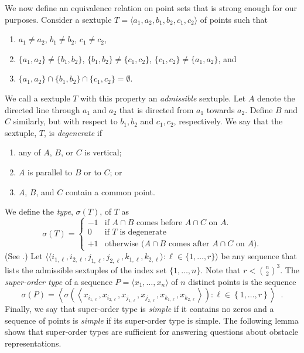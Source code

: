 \documentclass{patmorin}
\begin{document}
We now define an equivalence relation on point sets that is
strong enough for our purposes.  Consider a sextuple $T=\langle
a_1,a_2,b_1,b_2,c_1,c_2\rangle$ of points such that
\begin{enumerate}
  \item  $a_1\neq a_2$, $b_1\neq b_2$, $c_1\neq c_2$, 
  \item  $\{a_1,a_2\}\neq \{b_1,b_2\}$, 
$\{b_1,b_2\}\neq \{c_1,c_2\}$, $\{c_1,c_2\}\neq \{a_1,a_2\}$, and 
  \item $\{a_1,a_2\}\cap\{b_1,b_2\}\cap\{c_1,c_2\}=\emptyset$.
\end{enumerate}
We call a sextuple $T$ with this property an \emph{admissible} sextuple.
Let $A$ denote the directed line through $a_1$ and $a_2$ that is directed
from $a_1$ towards $a_2$. Define $B$ and $C$ similarly, but with respect
to $b_1,b_2$ and $c_1,c_2$, respectively.  We say that the sextuple,
$T$, is \emph{degenerate} if
\begin{enumerate}
  \item any of $A$, $B$, or $C$ is vertical;
  \item $A$ is parallel to $B$ or to $C$; or
  \item $A$, $B$, and $C$ contain a common point.
\end{enumerate}
We define the \emph{type}, $\sigma(T)$, of $T$ as
\[
    \sigma(T) = \left\{\begin{array}{rl}
      -1 & \text{if $A\cap B$ comes before $A\cap C$ on $A$.} \\
      0 & \text{if $T$ is degenerate} \\
      +1 & \text{otherwise ($A\cap B$ comes after $A\cap C$ on $A$).} 
    \end{array}\right.
\]
(See .)  Let $\langle\langle
i_{1,\ell},i_{2,\ell},j_{1,\ell},j_{2,\ell},k_{1,\ell},k_{2,\ell}\rangle:
\ell \in \{1,\ldots,r\}\rangle$ be any sequence that lists the
admissible sextuples of the index set $\{1,\ldots,n\}$.  Note that $r<
\binom{n}{2}^3$.  The \emph{super-order type} of a sequence $P=\langle
x_1,\ldots,x_n\rangle$ of $n$ distinct points is the sequence
\[
   \sigma(P) = \left\langle \sigma\left(\left\langle x_{i_{1,\ell}},x_{i_{2,\ell}},
       x_{j_{1,\ell}},x_{j_{2,\ell}},
       x_{k_{1,\ell}},x_{k_{2,\ell}}\right\rangle\right) : \ell\in\left\{1,\ldots,r\right\} \right\rangle \enspace .
\]
Finally, we say that super-order type is \emph{simple} if it contains
no zeros and a sequence of points is \emph{simple} if its super-order
type is simple.  The following lemma shows that super-order types are
sufficient for answering questions about obstacle representations.
\end{document}
